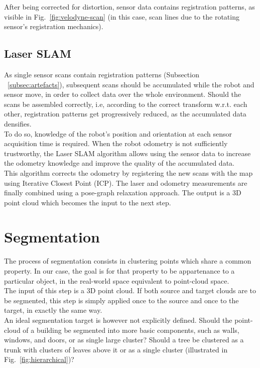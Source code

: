 After being corrected for distortion, sensor data contains registration patterns, as visible in Fig.~\ref{fig:velodyne-scan} (in this case, scan lines due to the rotating sensor's registration mechanics).

\subsection{Laser SLAM}
\label{subsec:SLAM}

As single sensor scans contain registration patterns (Subsection ~\ref{subsec:artefacts}), subsequent scans should be accumulated while the robot and sensor move, in order to collect data over the whole environment. Should the scans be assembled correctly, i.e, according to the correct transform w.r.t. each other, registration patterns get progressively reduced, as the accumulated data densifies.\\

To do so, knowledge of the robot's position and orientation at each sensor acquisition time is required. When the robot odometry is not sufficiently trustworthy, the Laser SLAM algorithm allows using the sensor data to increase the odometry knowledge and improve the quality of the accumulated data.\\

This algorithm corrects the odometry by registering the new scans with the map using Iterative Closest Point (ICP). The laser and odometry measurements are finally combined using a pose-graph relaxation approach. The output is a 3D point cloud which becomes the input to the next step.

\section{Segmentation}
\label{sec:segmentation}

The process of segmentation consists in clustering points which share a common property. In our case, the goal is for that property to be appartenance to a particular object, in the real-world space equivalent to point-cloud space.\\

The input of this step is a 3D point cloud. If both source and target clouds are to be segmented, this step is simply applied once to the source and once to the target, in exactly the same way.\\

An ideal segmentation target is however not explicitly defined. Should the point-cloud of a building be segmented into more basic components, such as walls, windows, and doors, or as single large cluster? Should a tree be clustered as a trunk with clusters of leaves above it or as a single cluster (illustrated in Fig.~\ref{fig:hierarchical})?\\

